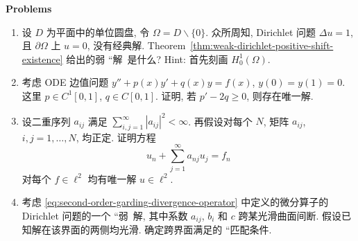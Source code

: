 \textbf{Problems}

\begin{enumerate}[label=\thesection.\arabic*.,ref=\thesection.\arabic*,start=1,series=book-problems]

\item\label{ex:punctured-disk-dirichlet-weak-solution} 设 $D$ 为平面中的单位圆盘, 令 $\Omega=D\backslash\{0\}$. 众所周知, Dirichlet 问题 $\Delta u=1$, 且 $\partial\Omega$ 上 $u=0$, 没有经典解. Theorem~\ref{thm:weak-dirichlet-positive-shift-existence} 给出的弱 ``解\textquotesingle\textquotesingle\ 是什么? Hint: 首先刻画 $H_0^1(\Omega)$.

\item\label{ex:ode-coercive-dirichlet-uniqueness} 考虑 ODE 边值问题 $y''+p(x)y'+q(x)y=f(x)$, $y(0)=y(1)=0$. 这里 $p\in C^1[0,1]$, $q\in C[0,1]$. 证明, 若 $p'-2q\geq0$, 则存在唯一解.

\item\label{ex:positive-double-sequence-l2-solvability} 设二重序列 $a_{ij}$ 满足 $\sum_{i,j=1}^\infty|a_{ij}|^2<\infty$. 再假设对每个 $N$, 矩阵 $a_{ij}$, $i,j=1,\ldots,N$, 均正定. 证明方程
\begin{equation}\label{eq:positive-double-sequence-l2-system-problem}
u_n+\sum_{j=1}^\infty a_{nj}u_j=f_n
\end{equation}
对每个 $f\in\ell^2$ 均有唯一解 $u\in\ell^2$.

\item\label{ex:discontinuous-coefficient-interface-matching} 考虑 \eqref{eq:second-order-garding-divergence-operator} 中定义的微分算子的 Dirichlet 问题的一个 ``弱\textquotesingle\textquotesingle\ 解, 其中系数 $a_{ij}$, $b_i$ 和 $c$ 跨某光滑曲面间断. 假设已知解在该界面的两侧均光滑. 确定跨界面满足的 ``匹配条件\textquotesingle\textquotesingle.

\end{enumerate}
